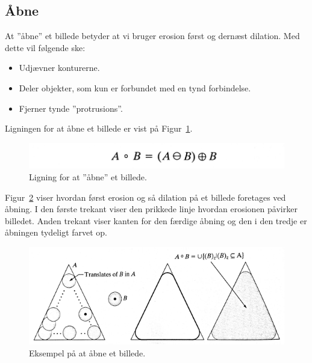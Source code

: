 \subsection{Åbne}

At ''åbne'' et billede betyder at vi bruger erosion først og dernæst dilation. Med dette vil følgende ske:

\begin{itemize}
	\item Udjævner konturerne.
	\item Deler objekter, som kun er forbundet med en tynd forbindelse.
	\item Fjerner tynde ''protrusions''.
\end{itemize}

Ligningen for at åbne et billede er vist på Figur~\ref{fig:openingeq}.

\begin{figure}[H]
	\centering
	\includegraphics[width=0.5\linewidth]{figs/spm09/openingeq}
	\caption{Ligning for at ''åbne'' et billede.}
	\label{fig:openingeq}
\end{figure}

Figur~\ref{fig:opening-triangle} viser hvordan først erosion og så dilation på et billede foretages ved åbning. I den første trekant viser den prikkede linje hvordan erosionen påvirker billedet. Anden trekant viser kanten for den færdige åbning og den i den tredje er åbningen tydeligt farvet op.

\begin{figure}[H]
	\centering
	\includegraphics[width=0.9\linewidth]{figs/spm09/opening-triangle}
	\caption{Eksempel på at åbne et billede.}
	\label{fig:opening-triangle}
\end{figure}
